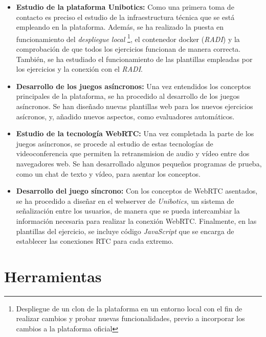 \documentclass[a4paper, 12pt]{book}
\begin{document}
\begin{itemize}
\item \textbf{Estudio de la plataforma Unibotics:} Como una primera toma de contacto es preciso el estudio de la infraestructura técnica que se está empleando en la plataforma. Además, se ha realizado la puesta en funcionamiento del \emph{despliegue local} \footnote{Despliegue de un clon de la plataforma en un entorno local con el fin de realizar cambios y probar nuevas funcionalidades, previo a incorporar los cambios a la plataforma oficial}, el contenedor docker (\emph{RADI}) y la comprobación de que todos los ejercicios funcionan de manera correcta. También, se ha estudiado el funcionamiento de las plantillas empleadas por los ejercicios y la conexión con el \emph{RADI}.

\item \textbf{Desarrollo de los juegos asíncronos:} Una vez entendidos los conceptos principales de la plataforma, se ha procedido al desarrollo de los juegos asíncronos. Se han diseñado nuevas plantillas web para los nuevos ejercicios asícronos, y, añadido nuevos aspectos, como evaluadores automáticos.

\item \textbf{Estudio de la tecnología WebRTC:} Una vez completada la parte de los juegos asíncronos, se procede al estudio de estas tecnologías de videoconferencia que permiten la retransmision de audio y vídeo entre dos navegadores web. Se han desarrollado algunos pequeños programas de prueba, como un chat de texto y vídeo, para asentar los conceptos.

\item \textbf{Desarrollo del juego síncrono:} Con los conceptos de WebRTC asentados, se ha procedido a diseñar en el webserver de \emph{Unibotics}, un sistema de señalización entre los usuarios, de manera que se pueda intercambiar la información necesaria para realizar la conexión WebRTC. Finalmente, en las plantillas del ejercicio, se incluye código \emph{JavaScript} que se encarga de establecer las conexiones RTC para cada extremo.
\end{itemize}


\cleardoublepage %
\chapter{Herramientas} 
\label{chap:herramientas}
\end{document}
